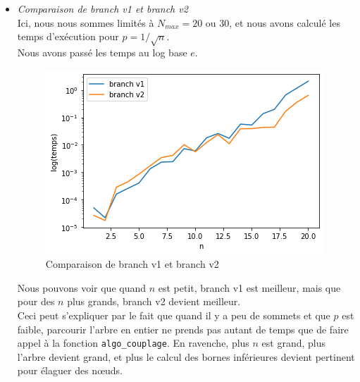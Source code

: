 \documentclass[12pt]{article}
\begin{document}
        \begin{itemize}
            \item \textit{Comparaison de branch v1 et branch v2} \\
                Ici, nous nous sommes limités à $N_{max} = 20$ ou 30, et nous avons calculé les temps d'exécution pour $p = 1/\sqrt{n}$. \\
                Nous avons passé les temps au log base $e$.
    
                \begin{figure}[H]
                    \caption{Comparaison de branch v1 et branch v2}
                    \includegraphics[scale=0.6]{figures/branch1-2_psqrt.png}
                    \centering
                \end{figure}
    
                Nous pouvons voir que quand $n$ est petit, branch v1 est meilleur, mais que pour des $n$ plus grands, branch v2 devient meilleur. \\
                Ceci peut s'expliquer par le fait que quand il y a peu de sommets et que $p$ est faible, parcourir l'arbre en entier ne prends pas autant de temps que de faire appel à la fonction \texttt{algo\_couplage}. En ravenche, plus $n$ est grand, plus l'arbre devient grand, et plus le calcul des bornes inférieures devient pertinent pour élaguer des nœuds.


\end{itemize}
\end{document}
